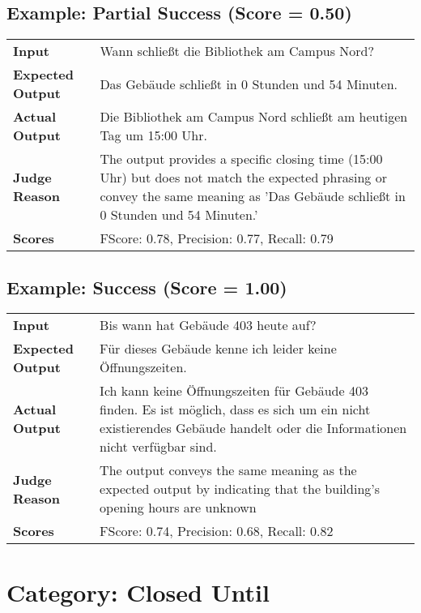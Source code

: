 \documentclass{article}
\begin{document}
\subsection*{Example: Partial Success (Score = 0.50)}
\begin{longtable}{p{} p{}}
\textbf{Input} & Wann schließt die Bibliothek am Campus Nord? \\
\textbf{Expected Output} & Das Gebäude schließt in 0 Stunden und 54 Minuten. \\
\textbf{Actual Output} & Die Bibliothek am Campus Nord schließt am heutigen Tag um 15:00 Uhr. \\
\textbf{Judge Reason} & The output provides a specific closing time (15:00 Uhr) but does not match the expected phrasing or convey the same meaning as 'Das Gebäude schließt in 0 Stunden und 54 Minuten.' \\
\textbf{Scores} & FScore: 0.78, Precision: 0.77, Recall: 0.79 \\
\end{longtable}
\subsection*{Example: Success (Score = 1.00)}
\begin{longtable}{p{} p{}}
\textbf{Input} & Bis wann hat Gebäude 403 heute auf? \\
\textbf{Expected Output} & Für dieses Gebäude kenne ich leider keine Öffnungszeiten. \\
\textbf{Actual Output} & Ich kann keine Öffnungszeiten für Gebäude 403 finden. Es ist möglich, dass es sich um ein nicht existierendes Gebäude handelt oder die Informationen nicht verfügbar sind. \\
\textbf{Judge Reason} & The output conveys the same meaning as the expected output by indicating that the building's opening hours are unknown \\
\textbf{Scores} & FScore: 0.74, Precision: 0.68, Recall: 0.82 \\
\end{longtable}
\section*{Category: Closed Until}
\end{document}

